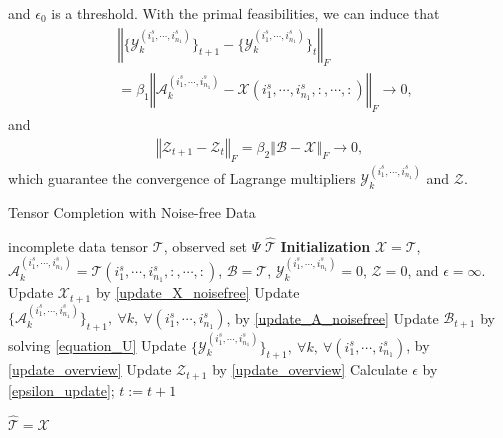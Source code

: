 \documentclass[12pt, draftcls, onecolumn]{IEEEtran}
\theoremstyle{plain}
\theoremstyle{definition}
\theoremstyle{remark}
\begin{document}
and $\epsilon_0$ is a threshold.
With the primal feasibilities, we can induce that 
\begin{align*}
	&\left\Vert\{\mathcal{Y}^{(i^s_{1},\cdots,i^s_{n_1})}_k\}_{t+1}-\{\mathcal{Y}^{(i^s_{1},\cdots,i^s_{n_1})}_k\}_{t}\right\Vert_F\\
	&=\beta_1\left\Vert\mathcal{A}^{(i^s_{1},\cdots,i^s_{n_1})}_k-\mathcal{X}(i^s_{1},\cdots,i^s_{n_1},:,\cdots,:)\right\Vert_F\rightarrow 0,
\end{align*}
and 
\begin{align*}
\left\Vert\mathcal{Z}_{t+1}-\mathcal{Z}_{t}\right\Vert_F
=\beta_2\left\Vert\mathcal{B}-\mathcal{X}\right\Vert_F\rightarrow 0,
\end{align*}
which guarantee the convergence of Lagrange multipliers $\mathcal{Y}^{(i^s_{1},\cdots,i^s_{n_1})}_k$ and $\mathcal{Z}$.

\begin{algorithm}
    \caption{Tensor Completion with Noise-free Data}
  \begin{algorithmic}[1]
    \INPUT incomplete data tensor $\mathcal{T}$, observed set $\Psi$%
    \OUTPUT $\hat{\mathcal{T}}$
    \STATE \textbf{Initialization} 
    $\mathcal{X}=\mathcal T$, $\mathcal{A}^{(i^s_{1},\cdots,i^s_{n_1})}_k=\mathcal T(i^s_{1},\cdots,i^s_{n_1},:,\cdots,:)$, $\mathcal{B}=\mathcal T$, $\mathcal{Y}^{(i^s_{1},\cdots,i^s_{n_1})}_k = {0}$, $\mathcal{Z}=0$,  and $\epsilon=\infty$.
        \STATE Update $\mathcal{X}_{t+1}$ by \eqref{update_X_noisefree}
        \STATE Update $\{\mathcal{A}^{(i^s_{1},\cdots,i^s_{n_1})}_k\}_{t+1},\ \forall k,\ \forall (i^s_{1},\cdots,i^s_{n_1})$, by \eqref{update_A_noisefree}
        \STATE Update $\mathcal{B}_{t+1}$ by solving \eqref{equation_U}
        \STATE Update $\{\mathcal{Y}^{(i^s_{1},\cdots,i^s_{n_1})}_k\}_{t+1},\ \forall k,\ \forall (i^s_{1},\cdots,i^s_{n_1})$, by \eqref{update_overview}
        \STATE Update $\mathcal{Z}_{t+1}$ by \eqref{update_overview}
        \STATE Calculate $\epsilon$ by \eqref{epsilon_update}; $t:=t+1$
        
    \ENDWHILE
    \STATE $\hat{\mathcal{T}}=\mathcal{X}$
  \end{algorithmic}
  \label{TC_alg_noise_free}
\end{algorithm}
\end{document}
